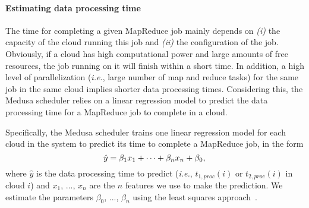 \documentclass[10pt, conference, compsocconf]{IEEEtran}
\begin{document}
\paragraph{Estimating data processing time} The time for completing a given MapReduce job mainly depends on \textit{(i)} the capacity of the cloud running this job and \textit{(ii)} the configuration of the job. Obviously, if a cloud has high computational power and large amounts of free resources, the job running on it will finish within a short time. In addition, a high level of parallelization (\textit{i.e.}, large number of map and reduce tasks) for the same job in the same cloud implies shorter data processing times. Considering this, the Medusa scheduler relies on a linear regression model to predict the data processing time for a MapReduce job to complete in a cloud.

Specifically, the Medusa scheduler trains one linear regression model for each cloud in the system to predict its time to complete a MapReduce job, in the form
\begin{equation}
  \label{eq:linear-regression:def:eq}
  \hat{y} = \beta_1x_1 + \dots + \beta_nx_n + \beta_0, \\
\end{equation}
where $\hat{y}$ is the data processing time to predict (\textit{i.e.}, $t_{1, proc}(i)$ or $t_{2, proc}(i)$ in cloud $i$) and $x_1$, ..., $x_n$ are the $n$ features we use to make the prediction.
We estimate the parameters $\beta_0$, ..., $\beta_n$ using the least squares approach~\cite{bjoerck_least_squares96}.
\end{document}
